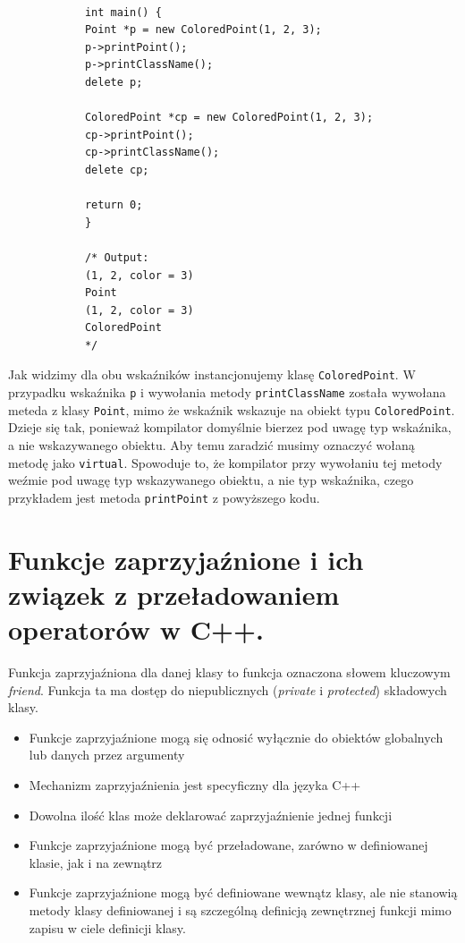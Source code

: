 \documentclass[12pt]{article}
\begin{document}
    \begin{definition}
        \textbf{} \\
        \begin{verbatim}
            int main() {
            Point *p = new ColoredPoint(1, 2, 3);
            p->printPoint();
            p->printClassName();
            delete p;

            ColoredPoint *cp = new ColoredPoint(1, 2, 3);
            cp->printPoint();
            cp->printClassName();
            delete cp;

            return 0;
            }

            /* Output:
            (1, 2, color = 3)
            Point
            (1, 2, color = 3)
            ColoredPoint
            */
        \end{verbatim}

        Jak widzimy dla obu wskaźników instancjonujemy klasę \texttt{ColoredPoint}. W przypadku wskaźnika \texttt{p} i wywołania metody \texttt{printClassName}
        została wywołana meteda z klasy \texttt{Point}, mimo że wskaźnik wskazuje na obiekt typu \texttt{ColoredPoint}. Dzieje się tak, ponieważ kompilator domyślnie
        bierzez pod uwagę typ wskaźnika, a nie wskazywanego obiektu. Aby temu zaradzić musimy oznaczyć wołaną metodę jako \texttt{virtual}. Spowoduje to, że
        kompilator przy wywołaniu tej metody weźmie pod uwagę typ wskazywanego obiektu, a nie typ wskaźnika, czego przykładem jest metoda \texttt{printPoint}
        z powyższego kodu.
    \end{definition}

    \newpage

    \section{Funkcje zaprzyjaźnione i ich związek z przeładowaniem operatorów w C++.}
    \begin{definition}
        Funkcja zaprzyjaźniona dla danej klasy to funkcja oznaczona słowem kluczowym
        \textit{friend}. Funkcja ta ma dostęp do niepublicznych (\textit{private} i
        \textit{protected}) składowych klasy.
    \end{definition}

    \begin{itemize}
        \item Funkcje zaprzyjaźnione mogą się odnosić wyłącznie do obiektów
        globalnych lub danych przez argumenty
        \item Mechanizm zaprzyjaźnienia jest specyficzny dla języka C++
        \item Dowolna ilość klas może deklarować zaprzyjaźnienie jednej funkcji
        \item Funkcje zaprzyjaźnione mogą być przeładowane, zarówno w definiowanej klasie, jak i na zewnątrz
        \item Funkcje zaprzyjaźnione mogą być definiowane wewnątz klasy, ale
        nie stanowią metody klasy definiowanej i są szczególną definicją
        zewnętrznej funkcji mimo zapisu w ciele definicji klasy.
    \end{itemize}
\end{document}
